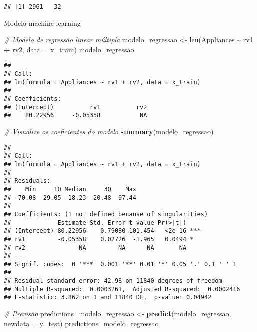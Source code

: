 \documentclass[
]{article}
\newenvironment{Shaded}{\begin{snugshade}}{\end{snugshade}}
\newcommand{\AttributeTok}[1]{\textcolor[rgb]{0.13,0.29,0.53}{#1}}
\newcommand{\CommentTok}[1]{\textcolor[rgb]{0.56,0.35,0.01}{\textit{#1}}}
\newcommand{\FunctionTok}[1]{\textcolor[rgb]{0.13,0.29,0.53}{\textbf{#1}}}
\newcommand{\NormalTok}[1]{#1}
\newcommand{\OtherTok}[1]{\textcolor[rgb]{0.56,0.35,0.01}{#1}}
\newcommand{\SpecialCharTok}[1]{\textcolor[rgb]{0.81,0.36,0.00}{\textbf{#1}}}
\begin{document}
\begin{verbatim}
## [1] 2961   32
\end{verbatim}

Modelo machine learning

\begin{Shaded}
\begin{Highlighting}[]
\CommentTok{\# Modelo de regressão linear múltipla}
\NormalTok{modelo\_regressao }\OtherTok{\textless{}{-}} \FunctionTok{lm}\NormalTok{(Appliances }\SpecialCharTok{\textasciitilde{}}\NormalTok{ rv1 }\SpecialCharTok{+}\NormalTok{ rv2, }\AttributeTok{data =}\NormalTok{ x\_train)}
\NormalTok{modelo\_regressao}
\end{Highlighting}
\end{Shaded}

\begin{verbatim}
## 
## Call:
## lm(formula = Appliances ~ rv1 + rv2, data = x_train)
## 
## Coefficients:
## (Intercept)          rv1          rv2  
##    80.22956     -0.05358           NA
\end{verbatim}

\begin{Shaded}
\begin{Highlighting}[]
\CommentTok{\# Visualize os coeficientes do modelo}
\FunctionTok{summary}\NormalTok{(modelo\_regressao)}
\end{Highlighting}
\end{Shaded}

\begin{verbatim}
## 
## Call:
## lm(formula = Appliances ~ rv1 + rv2, data = x_train)
## 
## Residuals:
##    Min     1Q Median     3Q    Max 
## -70.08 -29.05 -18.23  20.48  97.44 
## 
## Coefficients: (1 not defined because of singularities)
##             Estimate Std. Error t value Pr(>|t|)    
## (Intercept) 80.22956    0.79080 101.454   <2e-16 ***
## rv1         -0.05358    0.02726  -1.965   0.0494 *  
## rv2               NA         NA      NA       NA    
## ---
## Signif. codes:  0 '***' 0.001 '**' 0.01 '*' 0.05 '.' 0.1 ' ' 1
## 
## Residual standard error: 42.98 on 11840 degrees of freedom
## Multiple R-squared:  0.0003261,  Adjusted R-squared:  0.0002416 
## F-statistic: 3.862 on 1 and 11840 DF,  p-value: 0.04942
\end{verbatim}

\begin{Shaded}
\begin{Highlighting}[]
\CommentTok{\# Previsão}
\NormalTok{predictions\_modelo\_regressao }\OtherTok{\textless{}{-}} \FunctionTok{predict}\NormalTok{(modelo\_regressao, }\AttributeTok{newdata =}\NormalTok{ y\_test)}
\NormalTok{predictions\_modelo\_regressao}
\end{Highlighting}
\end{Shaded}
\end{document}
